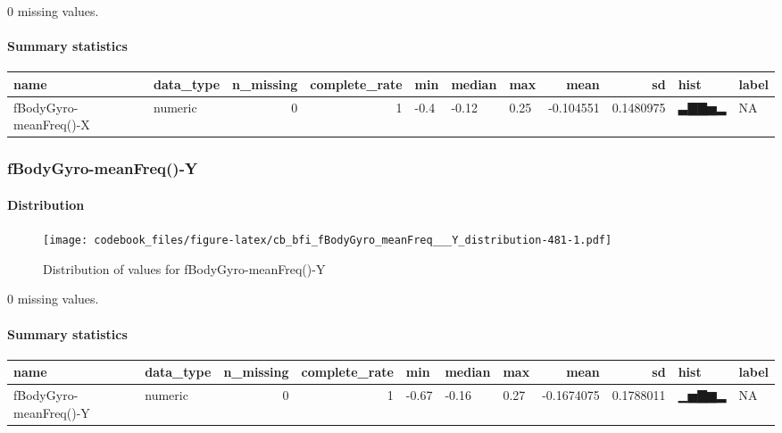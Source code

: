 \documentclass[
]{article}
\begin{document}
0 missing values.

\hypertarget{fBodyGyro_meanFreq___X_summary}{%
\paragraph{Summary statistics}\label{fBodyGyro_meanFreq___X_summary}}

\begin{longtable}[]{@{}llrrlllrrll@{}}
\toprule
name & data\_type & n\_missing & complete\_rate & min & median & max &
mean & sd & hist & label \\
\midrule
\endhead
fBodyGyro-meanFreq()-X & numeric & 0 & 1 & -0.4 & -0.12 & 0.25 &
-0.104551 & 0.1480975 & ▃▇▇▅▂ & NA \\
\bottomrule
\end{longtable}

\hypertarget{fBodyGyro_meanFreq___Y}{%
\subsubsection{fBodyGyro-meanFreq()-Y}\label{fBodyGyro_meanFreq___Y}}

\hypertarget{fBodyGyro_meanFreq___Y_distribution}{%
\paragraph{Distribution}\label{fBodyGyro_meanFreq___Y_distribution}}

\begin{figure}
\centering
\texttt{[image: codebook\_files/figure-latex/cb\_bfi\_fBodyGyro\_meanFreq\_\_\_Y\_distribution-481-1.pdf]}
\caption{Distribution of values for fBodyGyro-meanFreq()-Y}
\end{figure}

0 missing values.

\hypertarget{fBodyGyro_meanFreq___Y_summary}{%
\paragraph{Summary statistics}\label{fBodyGyro_meanFreq___Y_summary}}

\begin{longtable}[]{@{}llrrlllrrll@{}}
\toprule
name & data\_type & n\_missing & complete\_rate & min & median & max &
mean & sd & hist & label \\
\midrule
\endhead
fBodyGyro-meanFreq()-Y & numeric & 0 & 1 & -0.67 & -0.16 & 0.27 &
-0.1674075 & 0.1788011 & ▁▅▇▆▂ & NA \\
\bottomrule
\end{longtable}
\end{document}
